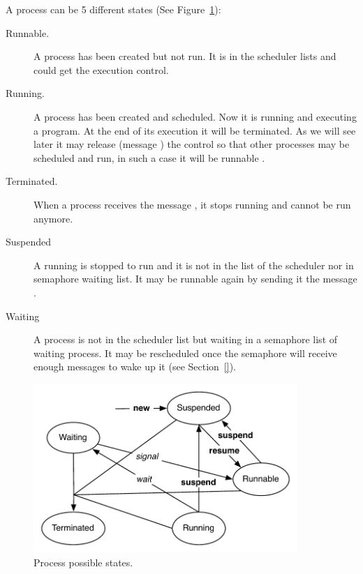 \documentclass[a4paper,10pt,twoside]{book}
\begin{document}
A process can be 5 different states (See Figure~\ref{fig:processState}):
\begin{description}
\item [Runnable.] A process has been created but not run. It is in the scheduler lists and could get the execution control. 

\item [Running.] A process has been created and scheduled. Now it is running and executing a program. At the end of its execution it will be terminated. As we will see later it may release (message ) the control so that other processes may be scheduled and run, in such a case it will be runnable . 

\item [Terminated.] When a process receives the message , it stops running and cannot be run anymore. 

\item [Suspended] A running is stopped to run and it is not in the list of the scheduler nor in semaphore waiting list. It may be runnable again by sending it the message .

\item [Waiting] A process is not in the scheduler list but waiting in a semaphore list of waiting process. It may be rescheduled once the semaphore will receive enough messages  to wake up it (see Section~\ref{}). 
\end{description}




\begin{figure}
\begin{center}
\includegraphics[width=10cm]{ProcessState}
\caption{Process possible states.\label{fig:processState}}
\end{center}
\end{figure}
\end{document}
